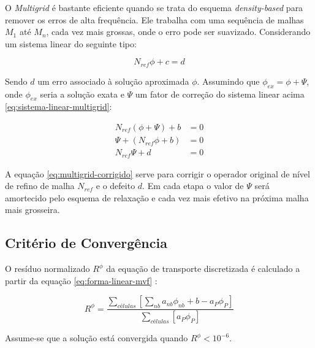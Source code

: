 O \textit{Multigrid} é bastante eficiente quando se trata do esquema \textit{density-based} para remover os erros de alta frequência. Ele trabalha com uma sequência de malhas $M_1$ até $M_n$, cada vez mais grossas, onde o erro pode ser suavizado. Considerando um sistema linear do seguinte tipo:

\begin{equation}
    \label{eq:sistema-linear-multigrid}
    N_{ref}\phi + c = d
\end{equation}

Sendo $d$ um erro associado à solução aproximada $\phi$. Assumindo que $\phi_{ex} = \phi + \Psi$, onde $\phi_{ex}$ seria a solução exata e $\Psi$ um fator de correção do sistema linear acima \ref{eq:sistema-linear-multigrid}:

\begin{subequations}\label{eq:multigrid-corrigido} 
\begin{align}
    N_{ref}(\phi + \Psi) + b &= 0 \\
    \Psi + (N_{ref}\phi + b) &= 0 \\
    N_{ref}\Psi + d &= 0
\end{align}
\end{subequations}

A equação \ref{eq:multigrid-corrigido} serve para corrigir o operador original de nível de refino de malha $N_{ref}$ e o defeito $d$. Em cada etapa o valor de $\Psi$ será amortecido pelo esquema de relaxação e cada vez mais efetivo na próxima malha mais grosseira.

\subsection{Critério de Convergência}

O resíduo normalizado $R^{\phi}$ da equação de transporte discretizada é calculado a partir da equação \ref{eq:forma-linear-mvf} \cite{Rezende2009}:

\begin{equation}
\label{eq:criterio-convergencia}
	R^{\phi} = \frac{\sum_{células} \left[ \sum_{nb}a_{nb}\phi_{nb}+b-a_{P}\phi_{P}\right]}{\sum_{células}\left[a_{P}\phi_{P}\right]}    
\end{equation}

Assume-se que a solução está convergida quando $R^{\phi} < 10^{-6}$.